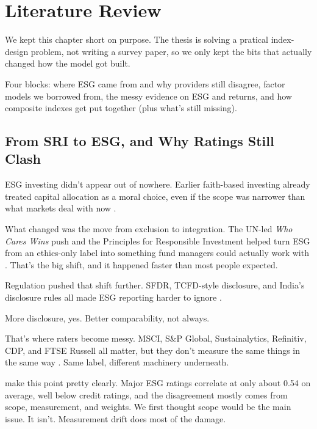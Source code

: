 \chapter{Literature Review}
\label{ch:lit}

We kept this chapter short on purpose. The thesis is solving a pratical index-design problem, not writing a survey paper, so we only kept the bits that actually changed how the model got built.

Four blocks: where ESG came from and why providers still disagree, factor models we borrowed from, the messy evidence on ESG and returns, and how composite indexes get put together (plus what's still missing).

\section{From SRI to ESG, and Why Ratings Still Clash}
\label{sec:lit_evolution_providers}

ESG investing didn't appear out of nowhere. Earlier faith-based investing already treated capital allocation as a moral choice, even if the scope was narrower than what markets deal with now \cite{renneboog_terhorst_zhang_2008}.

What changed was the move from exclusion to integration. The UN-led \textit{Who Cares Wins} push and the Principles for Responsible Investment helped turn ESG from an ethics-only label into something fund managers could actually work with \cite{pri_2006}. That's the big shift, and it happened faster than most people expected.

Regulation pushed that shift further. SFDR, TCFD-style disclosure, and India's disclosure rules all made ESG reporting harder to ignore \cite{eu_sfdr_2019, tcfd_2017}.

More disclosure, yes. Better comparability, not always.

That's where raters become messy. MSCI, S\&P Global, Sustainalytics, Refinitiv, CDP, and FTSE Russell all matter, but they don't measure the same things in the same way \cite{msci_esg_methodology, sp_global_esg, sustainalytics_esg, refinitiv_esg, cdp_methodology, ftse_russell_esg}. Same label, different machinery underneath.

\textcite{berg_koelbel_rigobon_2022} make this point pretty clearly. Major ESG ratings correlate at only about 0.54 on average, well below credit ratings, and the disagreement mostly comes from scope, measurement, and weights. We first thought scope would be the main issue. It isn't. Measurement drift does most of the damage.

